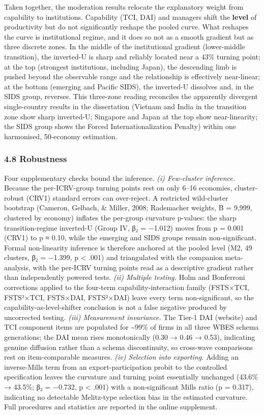 \documentclass[
  12pt,a4paper]{article}
\begin{document}
Taken together, the moderation results relocate the explanatory weight
from capability to institutions. Capability (TCI, DAI) and managers
shift the \textbf{level} of productivity but do not significantly
reshape the pooled curve. What reshapes the curve is institutional
regime, and it does so not as a smooth gradient but as three discrete
zones. In the middle of the institutional gradient (lower-middle
transition), the inverted-U is sharp and reliably located near a 43\%
turning point; at the top (strongest institutions, including Japan), the
descending limb is pushed beyond the observable range and the
relationship is effectively near-linear; at the bottom (emerging and
Pacific SIDS), the inverted-U dissolves and, in the SIDS group,
reverses. This three-zone reading reconciles the apparently divergent
single-country results in the dissertation (Vietnam and India in the
transition zone show sharp inverted-U; Singapore and Japan at the top
show near-linearity; the SIDS group shows the Forced
Internationalization Penalty) within one harmonised, 50-economy
estimation.

\hypertarget{robustness}{%
\subsubsection{4.8 Robustness}\label{robustness}}

Four supplementary checks bound the inference. \emph{(i) Few-cluster
inference.} Because the per-ICRV-group turning points rest on only 6--16
economies, cluster-robust (CRV1) standard errors can over-reject. A
restricted wild-cluster bootstrap (Cameron, Gelbach, \& Miller, 2008;
Rademacher weights, B = 9,999, clustered by economy) inflates the
per-group curvature p-values: the sharp transition-regime inverted-U
(Group IV, β₂ = −1.012) moves from p = 0.001 (CRV1) to p ≈ 0.10, while
the emerging and SIDS groups remain non-significant. Formal
non-linearity inference is therefore anchored at the pooled level (M2,
49 clusters, β₂ = −1.399, p \textless{} .001) and triangulated with the
companion meta-analysis, with the per-ICRV turning points read as a
descriptive gradient rather than independently powered tests. \emph{(ii)
Multiple testing.} Holm and Bonferroni corrections applied to the
four-term capability-interaction family (FSTS×TCI, FSTS²×TCI, FSTS×DAI,
FSTS²×DAI) leave every term non-significant, so the
capability-as-level-shifter conclusion is not a false negative produced
by uncorrected testing. \emph{(iii) Measurement invariance.} The Tier-1
DAI (website) and TCI component items are populated for
\textasciitilde99\% of firms in all three WBES schema generations; the
DAI mean rises monotonically (0.30 → 0.46 → 0.53), indicating genuine
diffusion rather than a schema discontinuity, so cross-wave comparisons
rest on item-comparable measures. \emph{(iv) Selection into exporting.}
Adding an inverse-Mills term from an export-participation probit to the
controlled specification leaves the curvature and turning point
essentially unchanged (43.6\% → 43.5\%; β₂ = −0.732, p \textless{} .001)
with a non-significant Mills ratio (p = 0.317), indicating no detectable
Melitz-type selection bias in the estimated curvature. Full procedures
and statistics are reported in the online supplement.
\end{document}
